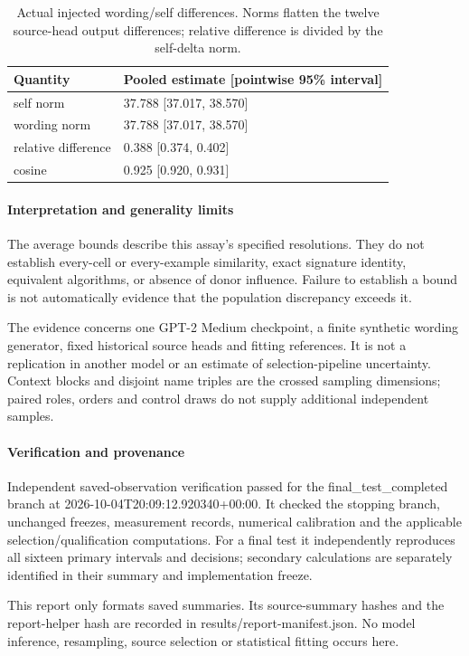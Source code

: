 \begin{table}[htbp]
\centering\footnotesize
\caption{Actual injected wording/self differences. Norms flatten the twelve source-head output differences; relative difference is divided by the self-delta norm.}
\label{tab:b007-injected-deltas}
\begin{tabularx}{\linewidth}{@{}YY@{}}
\toprule
Quantity & Pooled estimate [pointwise 95\% interval] \\
\midrule
self norm & 37.788 [37.017, 38.570] \\
wording norm & 37.788 [37.017, 38.570] \\
relative difference & 0.388 [0.374, 0.402] \\
cosine & 0.925 [0.920, 0.931] \\
\bottomrule
\end{tabularx}
\end{table}

\paragraph{Interpretation and generality limits}

The average bounds describe this assay's specified resolutions. They do not establish every-cell or every-example similarity, exact signature identity, equivalent algorithms, or absence of donor influence. Failure to establish a bound is not automatically evidence that the population discrepancy exceeds it.

The evidence concerns one GPT-2 Medium checkpoint, a finite synthetic wording generator, fixed historical source heads and fitting references. It is not a replication in another model or an estimate of selection-pipeline uncertainty. Context blocks and disjoint name triples are the crossed sampling dimensions; paired roles, orders and control draws do not supply additional independent samples.

\paragraph{Verification and provenance}

Independent saved-observation verification passed for the final\_test\_completed branch at 2026-10-04T20:09:12.920340+00:00. It checked the stopping branch, unchanged freezes, measurement records, numerical calibration and the applicable selection/qualification computations. For a final test it independently reproduces all sixteen primary intervals and decisions; secondary calculations are separately identified in their summary and implementation freeze.

This report only formats saved summaries. Its source-summary hashes and the report-helper hash are recorded in results/report-manifest.json. No model inference, resampling, source selection or statistical fitting occurs here.
